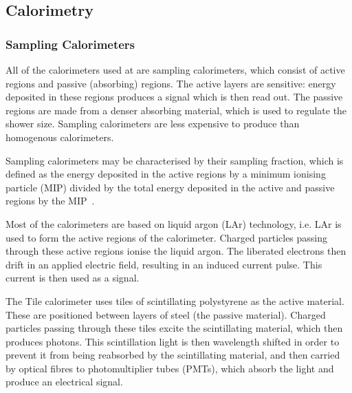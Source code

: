 \subsection{Calorimetry}

\subsubsection{Sampling Calorimeters}

All of the calorimeters used at \atlas are sampling calorimeters, which consist of active regions and passive (absorbing) regions. The active layers are sensitive: energy deposited in these regions produces a signal which is then read out. The passive regions are made from a denser absorbing material, which is used to regulate the shower size. Sampling calorimeters are less expensive to produce than homogenous calorimeters.

 Sampling calorimeters may be characterised by their sampling fraction, which is defined as the energy deposited in the active regions by a minimum ionising particle (MIP) divided by the total energy deposited in the active and passive regions by the MIP~\cite{wigmans2000calorimetry}.
%

Most of the \atlas calorimeters are based on liquid argon (LAr) technology, i.e. LAr is used to form the active regions of the calorimeter. Charged particles passing through these active regions ionise the liquid argon. The liberated electrons then drift in an applied electric field, resulting in an induced current pulse. This current is then used as a signal.

The \atlas Tile calorimeter uses tiles of scintillating polystyrene as the active material. These are positioned between layers of steel (the passive material). Charged particles passing through these tiles excite the scintillating material, which then produces photons. This scintillation light is then wavelength shifted in order to prevent it from being reabsorbed by the scintillating material, and then carried by optical fibres to photomultiplier tubes (PMTs), which absorb the light and produce an electrical signal.

